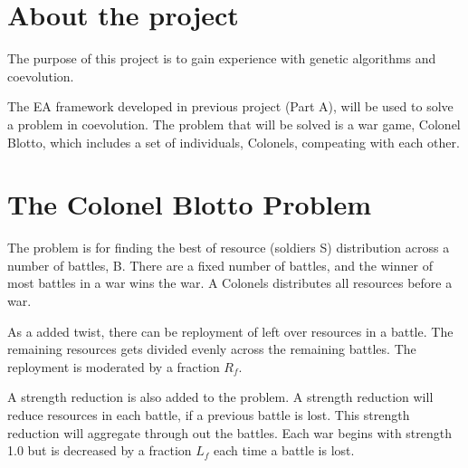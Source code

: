 \section{About the project}
The purpose of this project is to gain experience with genetic algorithms and coevolution. 

The EA framework developed in previous project (Part A), will be used to solve a problem in coevolution.
The problem that will be solved is a war game, Colonel Blotto, which includes a set of individuals, Colonels,
compeating with each other.


\section{The Colonel Blotto Problem}

The problem is for finding the best of resource (soldiers S) distribution across a number of battles, B. There are 
a fixed number of battles, and the winner of most battles in a war wins the war. A Colonels distributes 
all resources before a war.

As a added twist, there can be reployment of left over resources in a battle. The remaining resources gets divided
evenly across the remaining battles. The reployment is moderated by a fraction $R_{f}$.

A strength reduction is also added to the problem. A strength reduction will reduce resources in each battle, if
a previous battle is lost. This strength reduction will aggregate through out the battles. Each war begins with 
strength 1.0 but is decreased by a fraction $L_{f}$ each time a battle is lost.
